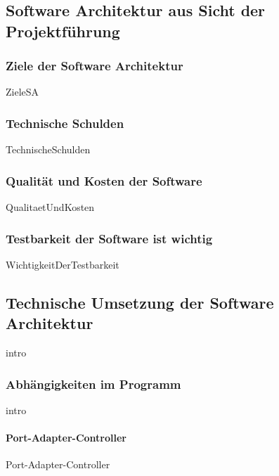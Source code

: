 \documentclass{article}
\begin{document}
    \subsection{Software Architektur aus Sicht der Projektführung}

        \subsubsection{Ziele der Software Architektur}
            {ZieleSA}
        \subsubsection{Technische Schulden}
            {TechnischeSchulden}

    \newpage
        \subsubsection{Qualität und Kosten der Software}
        \nocite{MF_isHighQuilatySoftwareWorthTheCost}
            {QualitaetUndKosten}
        
        \subsubsection{Testbarkeit der Software ist wichtig}
            {WichtigkeitDerTestbarkeit}
   
    \newpage
    \subsection{Technische Umsetzung der Software Architektur}
    \label{kap:commonArchitectureDescription}
        {intro}

        \newpage
        \subsubsection{Abhängigkeiten im Programm}
        \label{kap:Structur}
            {intro}
            \label{kap:StrukturIntro}

            \paragraph{Port-Adapter-Controller}
            \label{Port-Adapter-Controller}
                {Port-Adapter-Controller}
\end{document}
